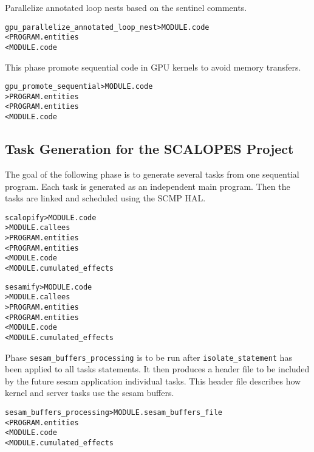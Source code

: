 \documentclass[a4paper]{report}
\newenvironment{PipsMake}{\begin{alltt}}{\end{alltt}}
\newenvironment{PipsPass}[1]{\label{pass:#1}}{}
\begin{document}
\begin{PipsPass}{gpu_parallelize_annotated_loop_nest}
Parallelize annotated loop nests based on the sentinel comments.
\end{PipsPass}

\begin{PipsMake}
gpu_parallelize_annotated_loop_nest        > MODULE.code
        < PROGRAM.entities
        < MODULE.code

\end{PipsMake}



\begin{PipsPass}{gpu_promote_sequential}
This phase promote sequential code in GPU kernels to avoid memory transfers.
\end{PipsPass}

\begin{PipsMake}
gpu_promote_sequential	> MODULE.code
		> PROGRAM.entities
		< PROGRAM.entities
		< MODULE.code
\end{PipsMake}


\subsection{Task Generation for the SCALOPES Project}
\label{subsubsection-scalopes-project}

The goal of the following phase is to generate several tasks from one
sequential program. Each task is generated as an independent main
program. Then the tasks are linked and scheduled using the SCMP HAL.

\begin{PipsMake}
scalopify                    > MODULE.code
		> MODULE.callees
		> PROGRAM.entities
		< PROGRAM.entities
		< MODULE.code
                < MODULE.cumulated_effects
\end{PipsMake}
\begin{PipsMake}
sesamify                    > MODULE.code
		> MODULE.callees
		> PROGRAM.entities
		< PROGRAM.entities
		< MODULE.code
                < MODULE.cumulated_effects
\end{PipsMake}

\begin{PipsPass}{sesam_buffers_processing}
Phase \texttt{sesam\_buffers\_processing} is to be run after
\texttt{isolate\_statement} has been applied to all tasks
statements. It then produces a header file to be included by the
future sesam application individual tasks. This header file describes
how kernel and server tasks use the sesam buffers.
\end{PipsPass}
\begin{PipsMake}
sesam_buffers_processing    > MODULE.sesam_buffers_file
              < PROGRAM.entities
              < MODULE.code
              < MODULE.cumulated_effects
\end{PipsMake}
\end{document}
